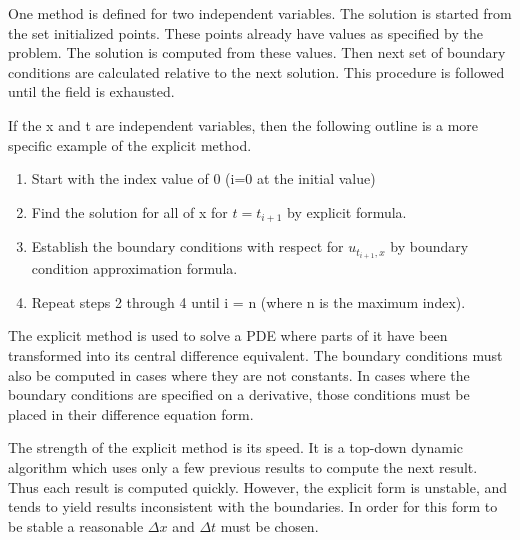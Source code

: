 
One method is defined for two independent variables.  The solution is started from the set initialized points.  These points already have values as specified by the problem.  The solution is computed from these values.  Then next set of boundary conditions are calculated relative to the next solution.  This procedure is followed until the field is exhausted.   

If the x and t are independent variables, then the following outline is a more specific example of the explicit method.  
\begin{enumerate}
\item Start with the index value of 0 (i=0 at the initial value)
\item Find the solution for all of x for $t=t_{i+1} $ by explicit formula.
\item Establish the boundary conditions with respect for $u_{t_{i+1} ,x}$ by boundary condition approximation formula.
\item Repeat steps 2 through 4 until i = n (where n is the maximum index).
\end{enumerate}


The explicit method is used to solve a PDE where parts of it have been transformed into its central difference equivalent.  The boundary conditions must also be computed in cases where they are not constants.  In cases where the boundary conditions are specified on a derivative, those conditions must be placed in their difference equation form.  %

The strength of the explicit method is its speed.  It is a top-down dynamic algorithm which uses only a few previous results to compute the next result.  Thus each result is computed quickly.  However, the
explicit form is unstable, and tends to yield results inconsistent with the boundaries.   In order for this form to be stable a reasonable $\Delta x$ and $\Delta t$ must be chosen.  


